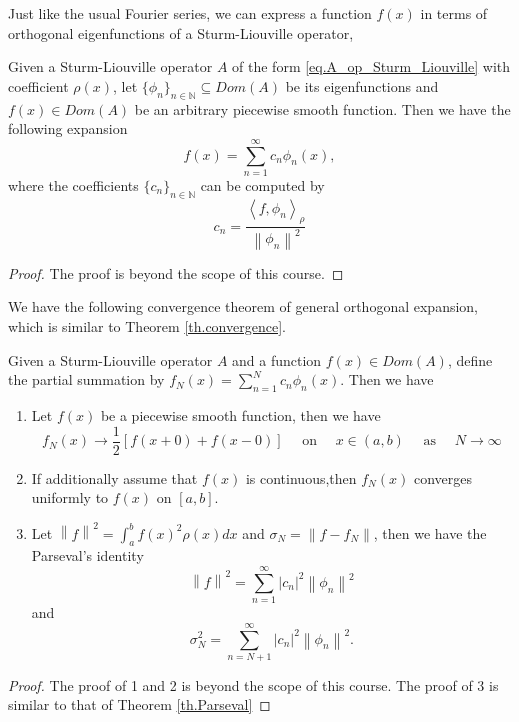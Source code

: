 Just like the usual Fourier series, we can express a function $f(x)$ in terms of orthogonal eigenfunctions of a Sturm-Liouville operator,
\begin{theorem}
    Given a Sturm-Liouville operator $A$ of the form \eqref{eq.A_op_Sturm_Liouville} with coefficient $\rho(x)$, let $\{\phi_n\}_{n\in \mathbb{N}}\subseteq \textit{Dom}(A)$ be its eigenfunctions and $f(x)\in \textit{Dom}(A)$ be an arbitrary piecewise smooth function. Then we have the following expansion
    \begin{equation}\label{eq.general_Fourier}
        f(x) =\sum_{n=1}^\infty c_n \phi_n(x),
    \end{equation}
    where the coefficients $\{c_n\}_{n\in \mathbb{N}}$ can be computed by
    \begin{equation}\label{eq.general_Fourier_coef}
        c_n=\frac{\left\langle f, \phi_n\right\rangle_\rho}{\left\|\phi_n\right\|^2}
    \end{equation}
\end{theorem}
\begin{proof}
    The proof is beyond the scope of this course. 
\end{proof}

We have the following convergence theorem of general orthogonal expansion, which is similar to Theorem \ref{th.convergence}.
\begin{theorem}[Convergence]
Given a Sturm-Liouville operator $A$ and a function $f(x)\in \textit{Dom}(A)$, define the partial summation by $f_N(x)=\sum_{n=1}^N c_n \phi_n(x)$. Then we have
\begin{enumerate}
    \item Let $f(x)$ be a piecewise smooth function, then we have 
    \begin{equation}
        f_N(x) \rightarrow \frac{1}{2}[f(x+0)+f(x-0)] \quad \text { on } \quad x \in(a, b) \quad \text { as } \quad N \rightarrow \infty
    \end{equation}
    \item If additionally assume that $f(x)$ is continuous,then $f_N(x)$ converges uniformly to $f(x)$ on $[a, b]$.    
    \item Let $\left\|f\right\|^2 = \int_a^b f(x)^2 \rho(x) d x$ and $\sigma_N = \left\|f - f_N\right\|$, then we have the Parseval's identity
    \begin{equation}\label{eq.Parseval_general}
        \left\|f\right\|^2 = \sum_{n=1}^\infty |c_n|^2\left\|\phi_n\right\|^2
    \end{equation}
    and
    \begin{equation}\label{eq.mean_square_error_Parseval_general}
        \sigma_N^2 = \sum_{n= N+1}^\infty |c_n|^2\left\|\phi_n\right\|^2.
    \end{equation}
\end{enumerate}
\end{theorem}
\begin{proof}
    The proof of 1 and 2 is beyond the scope of this course. The proof of 3 is similar to that of Theorem \ref{th.Parseval}
\end{proof}
